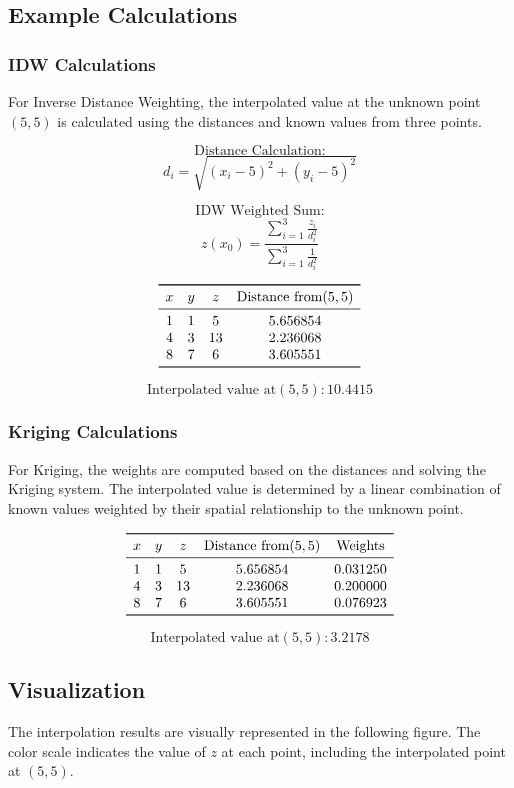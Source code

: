 \documentclass{article}
\begin{document}
\subsection{Example Calculations}

\subsubsection{IDW Calculations}
For Inverse Distance Weighting, the interpolated value at the unknown point $(5, 5)$ is calculated using the distances and known values from three points.

\[
\text{Distance Calculation:}
\]
\[
d_i = \sqrt{(x_i - 5)^2 + (y_i - 5)^2}
\]

\[
\text{IDW Weighted Sum:}
\]
\[
z(x_0) = \frac{\sum_{i=1}^3 \frac{z_i}{d_i^2}}{\sum_{i=1}^3 \frac{1}{d_i^2}}
\]

\[
\begin{array}{cccc}
\toprule
x & y & z & \text{Distance from} (5,5) \\
\midrule
1 & 1 & 5 & 5.656854 \\
4 & 3 & 13 & 2.236068 \\
8 & 7 & 6 & 3.605551 \\
\bottomrule
\end{array}
\]

\[
\text{Interpolated value at} (5,5): 10.4415
\]

\subsubsection{Kriging Calculations}
For Kriging, the weights are computed based on the distances and solving the Kriging system. The interpolated value is determined by a linear combination of known values weighted by their spatial relationship to the unknown point.

\[
\begin{array}{ccccc}
\toprule
x & y & z & \text{Distance from} (5,5) & \text{Weights} \\
\midrule
1 & 1 & 5 & 5.656854 & 0.031250 \\
4 & 3 & 13 & 2.236068 & 0.200000 \\
8 & 7 & 6 & 3.605551 & 0.076923 \\
\bottomrule
\end{array}
\]

\[
\text{Interpolated value at} (5,5): 3.2178
\]

\subsection{Visualization}
The interpolation results are visually represented in the following figure. The color scale indicates the value of $z$ at each point, including the interpolated point at $(5, 5)$.
\end{document}
